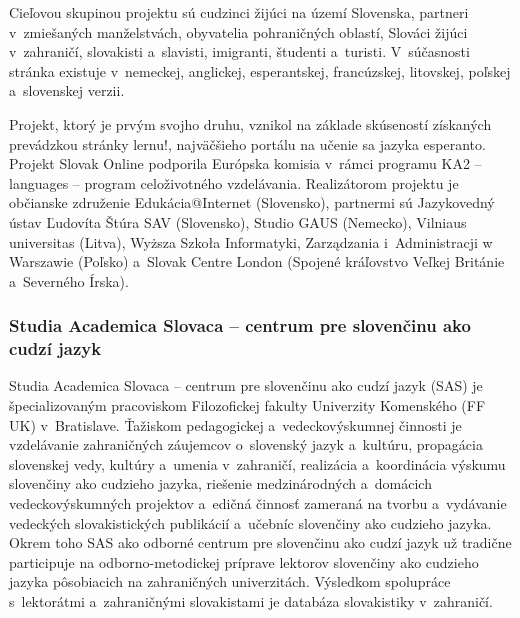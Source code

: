 \begin{multicols}{2}

Cieľovou skupinou projektu sú cudzinci žijúci na území Slovenska,
partneri v~zmiešaných manželstvách, obyvatelia pohraničných
oblastí, Slováci žijúci v~zahraničí, slovakisti a~slavisti,
imigranti, študenti a~turisti. V~súčasnosti stránka existuje
v~nemeckej, anglickej, esperantskej, francúzskej, litovskej, poľskej
a~slovenskej verzii.

Projekt, ktorý je prvým svojho druhu, vznikol na základe skúseností
získaných prevádzkou stránky
lernu!\cite{f7}, najväčšieho portálu na
učenie sa jazyka esperanto. Projekt Slovak Online podporila Európska
komisia v~rámci programu KA2 – languages – program celoživotného
vzdelávania. Realizátorom projektu je občianske združenie
Edukácia@Internet (Slovensko), partnermi sú Jazykovedný ústav
Ľudovíta Štúra SAV (Slovensko), Studio GAUS (Nemecko), Vilniaus
universitas (Litva), Wyższa Szkoła Informatyki, Zarządzania
i~Administracji w Warszawie (Poľsko) a~Slovak Centre London (Spojené
kráľovstvo Veľkej Británie a~Severného Írska).

\subsubsection{Studia Academica Slovaca – centrum pre slovenčinu ako cudzí jazyk}
Studia Academica Slovaca -- centrum pre slovenčinu ako cudzí jazyk (SAS) je špecializovaným pracoviskom Filozofickej fakulty Univerzity Komenského (FF UK) v~Bratislave. Ťažiskom pedagogickej a~vedeckovýskumnej činnosti je vzdelávanie zahraničných záujemcov o~slovenský jazyk a~kultúru, propagácia slovenskej vedy, kultúry a~umenia v~zahraničí, realizácia a~koordinácia výskumu slovenčiny ako cudzieho jazyka, riešenie medzinárodných a~domácich vedeckovýskumných projektov a~edičná činnosť zameraná na tvorbu a~vydávanie vedeckých slovakistických publikácií a~učebníc slovenčiny ako cudzieho jazyka. Okrem toho SAS ako odborné centrum pre slovenčinu ako cudzí jazyk už tradične participuje na odborno-metodickej príprave lektorov slovenčiny ako cudzieho jazyka pôsobiacich na zahraničných univerzitách. Výsledkom spolupráce s~lektorátmi a~zahraničnými slovakistami je databáza slovakistiky v~zahraničí.



\end{multicols}
